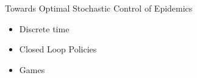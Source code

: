 \begin{frame}{Towards Optimal Stochastic Control of Epidemics}
    \begin{Huge}
        \begin{itemize}
            \item Discrete time
            \item Closed Loop Policies
            \item Games
        \end{itemize}
    \end{Huge}
\end{frame}